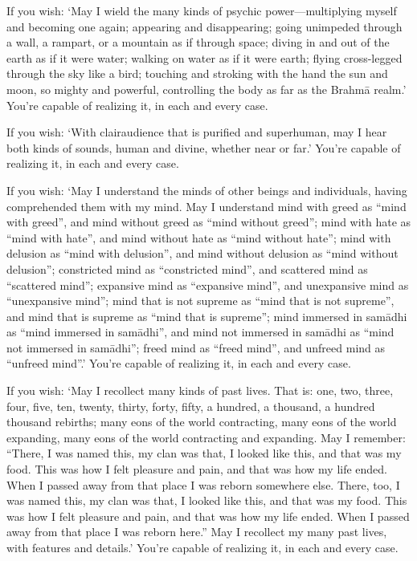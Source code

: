 \documentclass[12pt,openany]{book}%
\begin{document}
If you wish: ‘May I wield the many kinds of psychic power—multiplying myself and becoming one again; appearing and disappearing; going unimpeded through a wall, a rampart, or a mountain as if through space; diving in and out of the earth as if it were water; walking on water as if it were earth; flying cross-legged through the sky like a bird; touching and stroking with the hand the sun and moon, so mighty and powerful, controlling the body as far as the \textsanskrit{Brahmā} realm.’ You’re capable of realizing it, in each and every case. 

If you wish: ‘With clairaudience that is purified and superhuman, may I hear both kinds of sounds, human and divine, whether near or far.’ You’re capable of realizing it, in each and every case. 

If you wish: ‘May I understand the minds of other beings and individuals, having comprehended them with my mind. May I understand mind with greed as “mind with greed”, and mind without greed as “mind without greed”; mind with hate as “mind with hate”, and mind without hate as “mind without hate”; mind with delusion as “mind with delusion”, and mind without delusion as “mind without delusion”; constricted mind as “constricted mind”, and scattered mind as “scattered mind”; expansive mind as “expansive mind”, and unexpansive mind as “unexpansive mind”; mind that is not supreme as “mind that is not supreme”, and mind that is supreme as “mind that is supreme”; mind immersed in \textsanskrit{samādhi} as “mind immersed in \textsanskrit{samādhi}”, and mind not immersed in \textsanskrit{samādhi} as “mind not immersed in \textsanskrit{samādhi}”; freed mind as “freed mind”, and unfreed mind as “unfreed mind”.’ You’re capable of realizing it, in each and every case. 

If you wish: ‘May I recollect many kinds of past lives. That is: one, two, three, four, five, ten, twenty, thirty, forty, fifty, a hundred, a thousand, a hundred thousand rebirths; many eons of the world contracting, many eons of the world expanding, many eons of the world contracting and expanding. May I remember: “There, I was named this, my clan was that, I looked like this, and that was my food. This was how I felt pleasure and pain, and that was how my life ended. When I passed away from that place I was reborn somewhere else. There, too, I was named this, my clan was that, I looked like this, and that was my food. This was how I felt pleasure and pain, and that was how my life ended. When I passed away from that place I was reborn here.” May I recollect my many past lives, with features and details.’ You’re capable of realizing it, in each and every case. 
\end{document}
